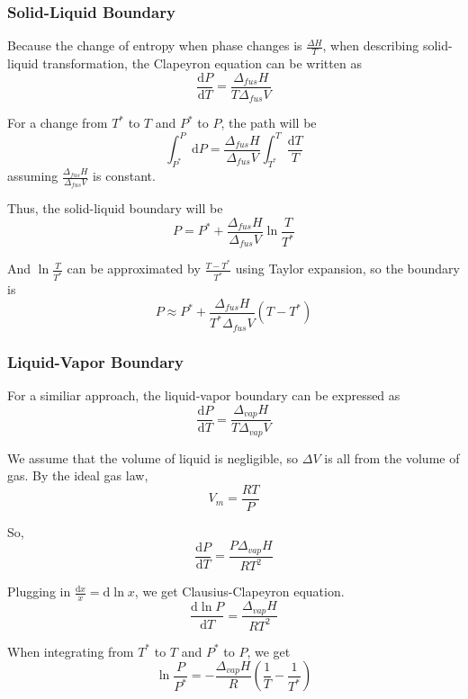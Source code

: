 \documentclass[letterpaper]{article}
\newcommand{\diff}{\mathrm{d}}
\begin{document}
\subsubsection*{Solid-Liquid Boundary}
Because the change of entropy when phase changes is $\frac{\Delta H}{T}$, when describing solid-liquid
transformation, the Clapeyron equation can be written as
\begin{equation*}
    \frac{\diff P}{\diff T}=\frac{\Delta_{fus}H}{T\Delta_{fus}V}
\end{equation*}

For a change from $T^*$ to $T$ and $P^*$ to $P$, the path will be
\begin{equation*}
    \int_{P^*}^{P}\diff P=\frac{\Delta_{fus}H}{\Delta_{fus}V}\int_{T^*}^{T}\frac{\diff T}{T}
\end{equation*}
assuming $\frac{\Delta_{fus}H}{\Delta_{fus}V}$ is constant.

Thus, the solid-liquid boundary will be
\begin{equation*}
    P=P^*+\frac{\Delta_{fus}H}{\Delta_{fus}V}\ln\frac{T}{T^*}
\end{equation*}

And $\ln\frac{T}{T^*}$ can be approximated by $\frac{T-T^*}{T^*}$ using Taylor expansion, so the boundary
is
\begin{equation*}
    P\approx P^*+\frac{\Delta_{fus}H}{T^*\Delta_{fus}V}(T-T^*)
\end{equation*}
\subsubsection*{Liquid-Vapor Boundary}
For a similiar approach, the liquid-vapor boundary can be expressed as
\begin{equation*}
    \frac{\diff P}{\diff T}=\frac{\Delta_{vap}H}{T\Delta_{vap}V}
\end{equation*}

We assume that the volume of liquid is negligible, so $\Delta V$ is all from
the volume of gas. By the ideal gas law,
\begin{equation*}
    V_m=\frac{RT}{P}
\end{equation*}

So,
\begin{equation*}
    \frac{\diff P}{\diff T}=\frac{P\Delta_{vap}H}{RT^2}
\end{equation*}

Plugging in $\frac{\diff x}{x}=\diff\ln x$, we get Clausius-Clapeyron equation.
\begin{equation*}
    \boxed{\frac{\diff\ln P}{\diff T}=\frac{\Delta_{vap}H}{RT^2}}
\end{equation*}

When integrating from $T^*$ to $T$ and $P^*$ to $P$, we get
\begin{equation*}
    \ln\frac{P}{P^*}=-\frac{\Delta_{vap}H}{R}(\frac{1}{T}-\frac{1}{T^*})
\end{equation*}
\end{document}
